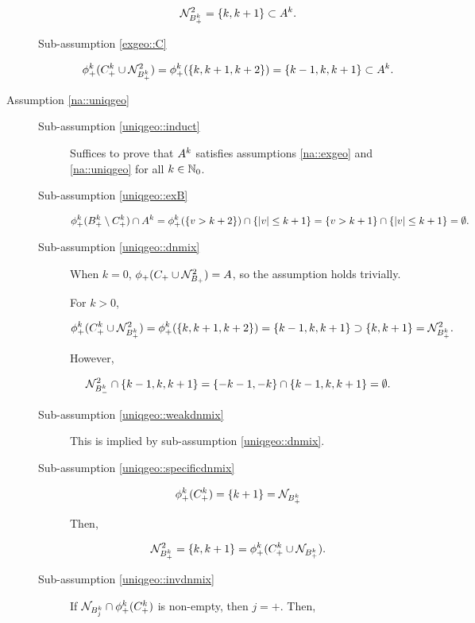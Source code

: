 \begin{description}
\begin{description}
\[\mathcal{N}^2_{B^{k}_+} = \{k,k+1\} \subset A^{k}.\]

\item[Sub-assumption \ref{exgeo::C}]

\[\phi^{k}_+(C^{k}_+\cup\mathcal{N}^2_{B^{k}_+}) = \phi^{k}_+(\{k,k+1,k+2\}) = \{k-1,k,k+1\} \subset A^{k}.\]

\end{description}

\item[Assumption \ref{na::uniqgeo}] 

\begin{description}
\item[Sub-assumption \ref{uniqgeo::induct}] Suffices to prove that \(A^{k}\) satisfies assumptions \ref{na::exgeo} and \ref{na::uniqgeo} for all \(k\in\mathbb{N}_0\).

\item[Sub-assumption \ref{uniqgeo::exB}]

\[\phi^{k}_{+}(B^{k}_+\setminus C^{k}_+)\cap A^{k} = \phi^{k}_{+}(\{v >  k+ 2\}) \cap \{|v|\leq k+1\} = \{v >  k+ 1\}\cap \{|v|\leq k+1\} = \emptyset.\]

\item[Sub-assumption \ref{uniqgeo::dnmix}] When \(k=0\), \(\phi_+(C_+\cup\mathcal{N}^2_{B_+}) = A\), so the assumption holds trivially.

\ind For \(k> 0\), 

\[\phi^{k}_+(C^{k}_+\cup\mathcal{N}^2_{B^{k}_+}) = \phi^{k}_+(\{k,k+1,k+2\}) = \{k-1,k,k+1\} \supset \{k,k+1\} = \mathcal{N}^2_{B^{k}_+}.\]

However,

\[\mathcal{N}^2_{B^{k}_-}\cap\{k-1,k,k+1\}= \{-k-1,-k\}\cap\{k-1,k,k+1\} = \emptyset.\]

\item[Sub-assumption \ref{uniqgeo::weakdnmix}] This is implied by sub-assumption \ref{uniqgeo::dnmix}.

\item[Sub-assumption \ref{uniqgeo::specificdnmix}]

\[\phi^{k}_+(C^{k}_+) = \{k+1\} = \mathcal{N}_{B^{k}_+}\]

Then,

\[\mathcal{N}^2_{B^{k}_+} = \{k,k+1\} = \phi^{k}_+(C^{k}_+\cup\mathcal{N}_{B^{k}_+}).\]


\item[Sub-assumption \ref{uniqgeo::invdnmix}] If \(\mathcal{N}_{B^{k}_j}\cap \phi^{k}_+(C^{k}_+)\) is non-empty, then \(j =+\). Then,


\end{description}
\end{description}
